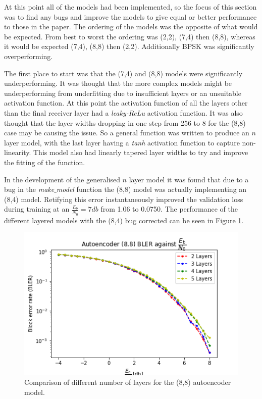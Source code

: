 \documentclass[12pt,onecolumn,letterpaper]{article}
\newcommand{\code}{\textit}
\newcommand\genfigsize{0.5}
\begin{document}
\label{sec:Improving88And74}

At this point all of the models had been implemented, so the focus of this section was to find any bugs and improve the models to give equal or better performance to those in the paper. The ordering of the models was the opposite of what would be expected. From best to worst the ordering was (2,2), (7,4) then (8,8), whereas it would be expected (7,4), (8,8) then (2,2). Additionally BPSK was significantly overperforming.  

The first place to start was that the (7,4) and (8,8) models were significantly underperforming. It was thought that the more complex models might be underperforming from underfitting due to insufficient layers or an unsuitable activation function. At this point the activation function of all the layers other than the final receiver layer had a \code{leaky-ReLu} activation function. It was also thought that the layer widths dropping in one step from 256 to 8 for the (8,8) case may be causing the issue. So a general function was written to produce an $n$ layer model, with the last layer having a \code{tanh} activation function to capture non-linearity. This model also had linearly tapered layer widths to try and improve the fitting of the function. 

In the development of the generalised $n$ layer model it was found that due to a bug in the \code{make$\_$model} function the (8,8) model was actually implementing an (8,4) model. Retifying this error instantaneously improved the validation loss during training at an $\frac{E_b}{N_0} = 7db$ from 1.06 to 0.0750. The performance of the different layered models with the (8,4) bug corrected can be seen in Figure \ref{fig:NumLayersBler}.

\begin{figure}[t]
   \centering
   \includegraphics[width=\genfigsize\linewidth]{figures/autoencoder_8_8_bler_EbNo_2-5_layers.png}
   \caption{Comparison of different number of layers for the (8,8) autoencoder model.}
   \label{fig:NumLayersBler}
\end{figure}
\end{document}
